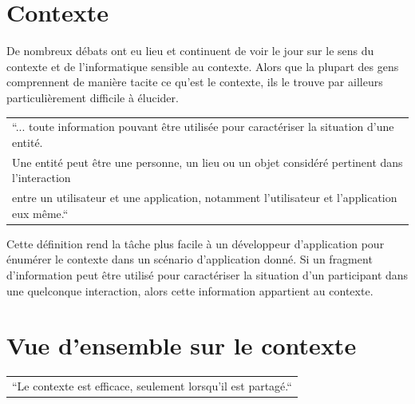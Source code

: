 \section{Contexte}

De nombreux débats ont eu lieu et continuent de voir le jour sur le sens du
contexte et de l'informatique sensible au contexte. Alors que la plupart des
gens comprennent de manière tacite ce qu'est le contexte, ils le trouve par
ailleurs particulièrement difficile à élucider.

{%
    \centering
    \begin{tabular}{l}
        ``... toute information pouvant être utilisée pour caractériser la
        situation d'une entité.\\ 
        Une entité peut être une personne, un lieu ou un objet considéré
        pertinent dans l'interaction \\ 
        entre un utilisateur et une application, notamment l'utilisateur et
        l'application eux même.``
        \cite{abowd_baltzer_1997} \\
    \end{tabular}
\par}%

Cette définition rend la tâche plus facile à un développeur d'application pour
énumérer le contexte dans un scénario d'application donné. Si un fragment
d'information peut être utilisé pour caractériser la situation d'un participant
dans une quelconque interaction, alors cette information appartient au contexte.

\section{Vue d'ensemble sur le contexte}

{%
    \centering
    \begin{tabular}{l}
        ``Le contexte est efficace, seulement lorsqu'il est partagé.``
        \cite{winograd_architectures_2001} \\
    \end{tabular}
\par}%


